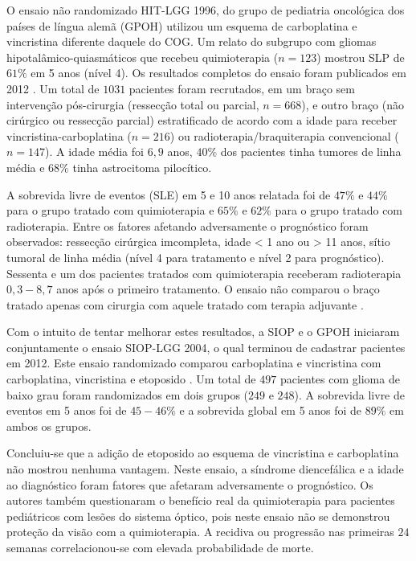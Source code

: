 \documentclass[11pt,a4paper,oldfontcommands]{memoir}
\begin{document}
O ensaio não randomizado HIT-LGG 1996, do grupo de pediatria oncológica dos países de língua alemã (GPOH) utilizou um esquema de carboplatina e vincristina diferente daquele do COG. Um relato do subgrupo com gliomas hipotalâmico-quiasmáticos que recebeu quimioterapia (\(n=123\)) mostrou SLP de \(61\%\) em 5 anos \cite{gnekow} (nível 4). Os resultados completos do ensaio foram publicados em 2012 \cite{gnekow2}. Um total de \(1031\) pacientes foram recrutados, em um braço sem intervenção pós-cirurgia (ressecção total ou parcial, \(n = 668\)), e outro braço (não cirúrgico ou ressecção parcial) estratificado de acordo com a idade para receber vincristina-carboplatina (\(n = 216\)) ou radioterapia/braquiterapia convencional (\(n = 147\)). A idade média foi \(6,9\) anos, \(40\%\) dos pacientes tinha tumores de linha média e \(68\%\) tinha astrocitoma pilocítico. 

A sobrevida livre de eventos (SLE) em 5 e 10 anos relatada foi de \(47\%\) e \(44\%\) para o grupo tratado com quimioterapia e \(65\%\) e \(62\%\) para o grupo tratado com radioterapia. Entre os fatores afetando adversamente o prognóstico foram observados: ressecção cirúrgica imcompleta, idade < 1 ano ou > 11 anos, sítio tumoral de linha média (nível 4 para tratamento e nível 2 para prognóstico). Sessenta e um dos pacientes tratados com quimioterapia receberam radioterapia \(0,3-8,7\) anos após o primeiro tratamento. O ensaio não comparou o braço tratado apenas com cirurgia com aquele tratado com terapia adjuvante \cite{gnekow2}. 

Com o intuito de tentar melhorar estes resultados, a SIOP e o GPOH iniciaram conjuntamente o ensaio SIOP-LGG 2004, o qual terminou de cadastrar pacientes em 2012. Este ensaio randomizado comparou carboplatina e vincristina com carboplatina, vincristina e etoposido \cite{gnekow3}. Um total de \(497\) pacientes com glioma de baixo grau foram randomizados em dois grupos (\(249\) e \(248\)). A sobrevida livre de eventos em 5 anos foi de \(45-46\%\) e a sobrevida global em 5 anos foi de \(89\%\) em ambos os grupos. 

Concluiu-se que a adição de etoposido ao esquema de vincristina e carboplatina não mostrou nenhuma vantagem. Neste ensaio, a síndrome diencefálica e a idade ao diagnóstico foram fatores que afetaram adversamente o prognóstico. Os autores também questionaram o benefício real da quimioterapia para pacientes pediátricos com lesões do sistema óptico, pois neste ensaio não se demonstrou proteção da visão com a quimioterapia. A recidiva ou progressão nas primeiras \(24\) semanas correlacionou-se com elevada probabilidade de morte\cite{gnekow4}.
\end{document}
